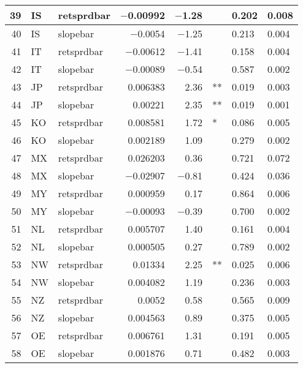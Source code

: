 \begin{longtable}{|r|l|l|r|r|l|l|l|}
   39 &    IS &    retsprdbar &    $-$0.00992 &    $-$1.28 &      &    0.202 &    0.008\\\hline
   40 &    IS &    slopebar &    $-$0.0054 &    $-$1.25 &      &    0.213 &    0.004\\\hline
   41 &    IT &    retsprdbar &    $-$0.00612 &    $-$1.41 &      &    0.158 &    0.004\\\hline
   42 &    IT &    slopebar &    $-$0.00089 &    $-$0.54 &      &    0.587 &    0.002\\\hline
   43 &    JP &    retsprdbar &    0.006383 &    2.36 &    ** &    0.019 &    0.003\\\hline
   44 &    JP &    slopebar &    0.00221 &    2.35 &    ** &    0.019 &    0.001\\\hline
   45 &    KO &    retsprdbar &    0.008581 &    1.72 &    * &    0.086 &    0.005\\\hline
   46 &    KO &    slopebar &    0.002189 &    1.09 &      &    0.279 &    0.002\\\hline
   47 &    MX &    retsprdbar &    0.026203 &    0.36 &      &    0.721 &    0.072\\\hline
   48 &    MX &    slopebar &    $-$0.02907 &    $-$0.81 &      &    0.424 &    0.036\\\hline
   49 &    MY &    retsprdbar &    0.000959 &    0.17 &      &    0.864 &    0.006\\\hline
   50 &    MY &    slopebar &    $-$0.00093 &    $-$0.39 &      &    0.700 &    0.002\\\hline
   51 &    NL &    retsprdbar &    0.005707 &    1.40 &      &    0.161 &    0.004\\\hline
   52 &    NL &    slopebar &    0.000505 &    0.27 &      &    0.789 &    0.002\\\hline
   53 &    NW &    retsprdbar &    0.01334 &    2.25 &    ** &    0.025 &    0.006\\\hline
   54 &    NW &    slopebar &    0.004082 &    1.19 &      &    0.236 &    0.003\\\hline
   55 &    NZ &    retsprdbar &    0.0052 &    0.58 &      &    0.565 &    0.009\\\hline
   56 &    NZ &    slopebar &    0.004563 &    0.89 &      &    0.375 &    0.005\\\hline
   57 &    OE &    retsprdbar &    0.006761 &    1.31 &      &    0.191 &    0.005\\\hline
   58 &    OE &    slopebar &    0.001876 &    0.71 &      &    0.482 &    0.003\\\hline

\end{longtable}
